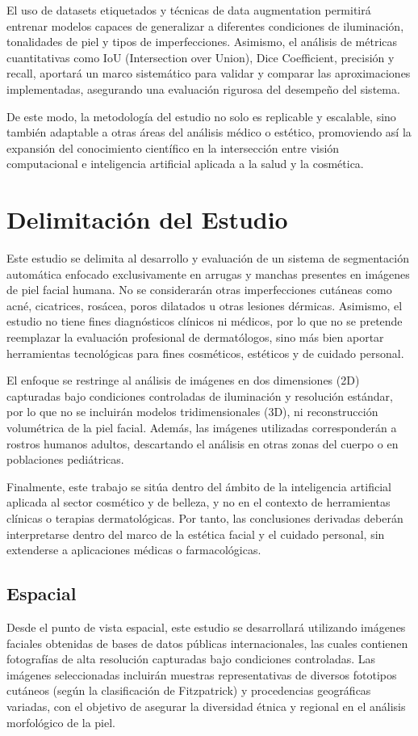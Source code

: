 El uso de datasets etiquetados y técnicas de data augmentation permitirá entrenar modelos capaces de generalizar a diferentes condiciones de iluminación, tonalidades de piel y tipos de imperfecciones. Asimismo, el análisis de métricas cuantitativas como IoU (Intersection over Union), Dice Coefficient, precisión y recall, aportará un marco sistemático para validar y comparar las aproximaciones implementadas, asegurando una evaluación rigurosa del desempeño del sistema.

De este modo, la metodología del estudio no solo es replicable y escalable, sino también adaptable a otras áreas del análisis médico o estético, promoviendo así la expansión del conocimiento científico en la intersección entre visión computacional e inteligencia artificial aplicada a la salud y la cosmética.

\section{Delimitación del Estudio}
Este estudio se delimita al desarrollo y evaluación de un sistema de segmentación automática enfocado exclusivamente en arrugas y manchas presentes en imágenes de piel facial humana. No se considerarán otras imperfecciones cutáneas como acné, cicatrices, rosácea, poros dilatados u otras lesiones dérmicas. Asimismo, el estudio no tiene fines diagnósticos clínicos ni médicos, por lo que no se pretende reemplazar la evaluación profesional de dermatólogos, sino más bien aportar herramientas tecnológicas para fines cosméticos, estéticos y de cuidado personal.

El enfoque se restringe al análisis de imágenes en dos dimensiones (2D) capturadas bajo condiciones controladas de iluminación y resolución estándar, por lo que no se incluirán modelos tridimensionales (3D), ni reconstrucción volumétrica de la piel facial. Además, las imágenes utilizadas corresponderán a rostros humanos adultos, descartando el análisis en otras zonas del cuerpo o en poblaciones pediátricas.

Finalmente, este trabajo se sitúa dentro del ámbito de la inteligencia artificial aplicada al sector cosmético y de belleza, y no en el contexto de herramientas clínicas o terapias dermatológicas. Por tanto, las conclusiones derivadas deberán interpretarse dentro del marco de la estética facial y el cuidado personal, sin extenderse a aplicaciones médicas o farmacológicas.

\subsection{Espacial}
Desde el punto de vista espacial, este estudio se desarrollará utilizando imágenes faciales obtenidas de bases de datos públicas internacionales, las cuales contienen fotografías de alta resolución capturadas bajo condiciones controladas. Las imágenes seleccionadas incluirán muestras representativas de diversos fototipos cutáneos (según la clasificación de Fitzpatrick) y procedencias geográficas variadas, con el objetivo de asegurar la diversidad étnica y regional en el análisis morfológico de la piel.

